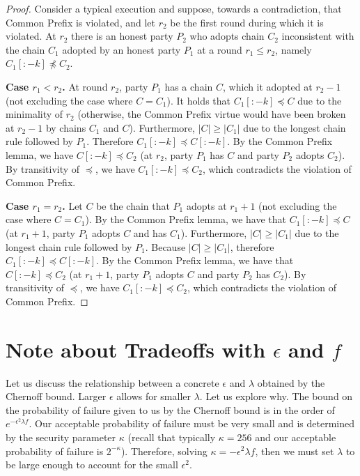 \begin{theorem}
\end{theorem}
\begin{proof}
    Consider a typical execution and suppose, towards a contradiction, that Common
    Prefix is violated, and let $r_2$ be the first round during which it is violated.
    At $r_2$ there is an honest party $P_2$ who adopts chain $C_2$
    inconsistent with the chain $C_1$ adopted by an honest party
    $P_1$ at a round $r_1 \leq r_2$, namely $C_1[{:}{-}k] \not\preceq C_2$.

    \noindent
    \textbf{Case $r_1 < r_2$.}
    At round $r_2$, party $P_1$ has a chain $C$,
    which it adopted at $r_2 - 1$ (not excluding the case
    where $C = C_1$). It holds that $C_1[{:}{-k}] \preceq C$
    due to the minimality of $r_2$ (otherwise, the Common Prefix virtue would
    have been broken at $r_2 - 1$ by chains $C_1$ and $C$).
    Furthermore, $|C| \geq |C_1|$ due to the longest chain
    rule followed by $P_1$. Therefore $C_1[{:}{-k}] \preceq C[{:}{-k}]$.
    By the Common Prefix lemma, we have $C[{:}{-k}] \preceq C_2$
    (at $r_2$, party $P_1$ has $C$ and party $P_2$ adopts $C_2$).
    By transitivity of $\preceq$, we have $C_1[{:}{-k}] \preceq C_2$,
    which contradicts the violation of Common Prefix.

    \noindent
    \textbf{Case $r_1 = r_2$.}
    Let $C$ be the chain that $P_1$ adopts at $r_1 + 1$ (not excluding the case
    where $C = C_1$).
    By the Common Prefix lemma, we have that
    $C_1[{:}{-k}] \preceq C$ (at $r_1 + 1$, party $P_1$ adopts $C$ and has $C_1$).
    Furthermore, $|C| \geq |C_1|$ due to the longest chain
    rule followed by $P_1$.
    Because $|C| \geq |C_1|$, therefore $C_1[{:}{-k}] \preceq C[{:}{-k}]$.
    By the Common Prefix lemma, we have that
    $C[{:}{-k}] \preceq C_2$ (at $r_1 + 1$, party $P_1$ adopts $C$ and party $P_2$ has $C_2$).
    By transitivity of $\preceq$, we have $C_1[{:}{-k}] \preceq C_2$,
    which contradicts the violation of Common Prefix.
\end{proof}

\section{Note about Tradeoffs with $\epsilon$ and $f$}

Let us discuss the relationship between a concrete $\epsilon$ and $\lambda$ obtained by the Chernoff bound.
Larger $\epsilon$ allows for smaller $\lambda$. Let us explore why. The bound on the probability of failure given to us by the Chernoff bound is in the order of $e^{-\epsilon^2 \lambda f}$. Our acceptable probability of failure must be very small and is determined by the security parameter $\kappa$ (recall that typically $\kappa = 256$ and our acceptable probability of failure is $2^{-\kappa}$). Therefore, solving $\kappa = -\epsilon^2 \lambda f$, then we must set $\lambda$ to be large enough to account for the small $\epsilon^2$.

